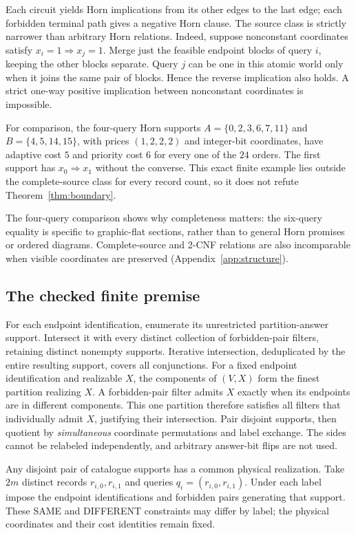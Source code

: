 \documentclass[pdflatex,sn-mathphys-num]{sn-jnl}
\theoremstyle{thmstyleone}
\theoremstyle{thmstylethree}
\theoremstyle{thmstyletwo}
\begin{document}
Each circuit yields Horn implications from its other edges to the last edge; each forbidden terminal path gives a negative Horn clause. The source class is strictly narrower than arbitrary Horn relations. Indeed, suppose nonconstant coordinates satisfy $x_i=1\Rightarrow x_j=1$. Merge just the feasible endpoint blocks of query $i$, keeping the other blocks separate. Query $j$ can be one in this atomic world only when it joins the same pair of blocks. Hence the reverse implication also holds. A strict one-way positive implication between nonconstant coordinates is impossible.

For comparison, the four-query Horn supports $A=\{0,2,3,6,7,11\}$ and $B=\{4,5,14,15\}$, with prices $(1,2,2,2)$ and integer-bit coordinates, have adaptive cost $5$ and priority cost $6$ for every one of the $24$ orders. The first support has $x_0\Rightarrow x_1$ without the converse. This exact finite example lies outside the complete-source class for every record count, so it does not refute Theorem~\ref{thm:boundary}.

The four-query comparison shows why completeness matters: the six-query equality is specific to graphic-flat sections, rather than to general Horn promises or ordered diagrams. Complete-source and 2-CNF relations are also incomparable when visible coordinates are preserved (Appendix~\ref{app:structure}).

\subsection{The checked finite premise}\label{sec:premise}
For each endpoint identification, enumerate its unrestricted partition-answer support. Intersect it with every distinct collection of forbidden-pair filters, retaining distinct nonempty supports. Iterative intersection, deduplicated by the entire resulting support, covers all conjunctions. For a fixed endpoint identification and realizable $X$, the components of $(V,X)$ form the finest partition realizing $X$. A forbidden-pair filter admits $X$ exactly when its endpoints are in different components. This one partition therefore satisfies all filters that individually admit $X$, justifying their intersection. Pair disjoint supports, then quotient by \emph{simultaneous} coordinate permutations and label exchange. The sides cannot be relabeled independently, and arbitrary answer-bit flips are not used.

Any disjoint pair of catalogue supports has a common physical realization. Take $2m$ distinct records $r_{i,0},r_{i,1}$ and queries $q_i=(r_{i,0},r_{i,1})$. Under each label impose the endpoint identifications and forbidden pairs generating that support. These SAME and DIFFERENT constraints may differ by label; the physical coordinates and their cost identities remain fixed.
\end{document}
